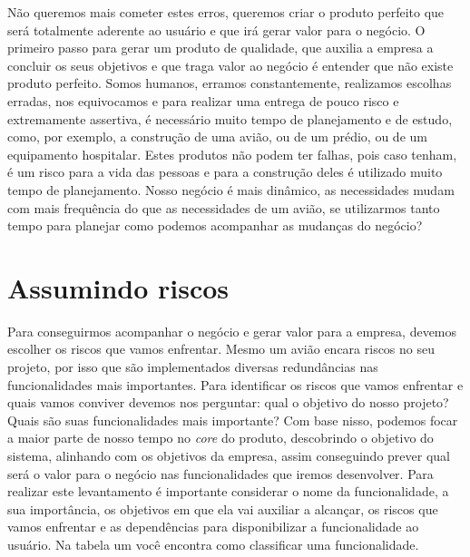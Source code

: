     Não queremos mais cometer estes erros, queremos criar o produto perfeito que
    será totalmente aderente ao usuário e que irá gerar valor para o negócio. O
    primeiro passo para gerar um produto de qualidade, que auxilia a empresa a
    concluir os seus objetivos e que traga valor ao negócio é entender que não
    existe produto perfeito. Somos humanos, erramos constantemente, realizamos
    escolhas erradas, nos equivocamos e para realizar uma entrega de pouco risco
    e extremamente assertiva, é necessário muito tempo de planejamento e de estudo,
    como, por exemplo, a construção de uma avião, ou de um prédio, ou de um equipamento
    hospitalar. Estes produtos não podem ter falhas, pois caso tenham, é um risco
    para a vida das pessoas e para a construção deles é utilizado muito tempo de
    planejamento. Nosso negócio é mais dinâmico, as necessidades mudam com
    mais frequência do que as necessidades de um avião, se utilizarmos tanto tempo
    para planejar como podemos acompanhar as mudanças do negócio?

    \section{Assumindo riscos}
      Para conseguirmos acompanhar o negócio e gerar valor para a empresa, devemos
      escolher os riscos que vamos enfrentar. Mesmo um avião encara riscos no seu
      projeto, por isso que são implementados diversas redundâncias nas funcionalidades
      mais importantes. Para identificar os riscos que vamos enfrentar e quais vamos
      conviver devemos nos perguntar: qual o objetivo do nosso projeto? Quais são
      suas funcionalidades mais importante? \newline
      Com base nisso, podemos focar a maior parte de nosso tempo no \textit{core}
      do produto, descobrindo o objetivo do sistema, alinhando com os objetivos
      da empresa, assim conseguindo prever qual será o valor para o negócio nas
      funcionalidades que iremos desenvolver. Para realizar este levantamento é
      importante considerar o nome da funcionalidade, a sua importância, os objetivos
      em que ela vai auxiliar a alcançar, os riscos que vamos enfrentar e as dependências
      para disponibilizar a funcionalidade ao usuário. Na tabela um você encontra
      como classificar uma funcionalidade. \newline

